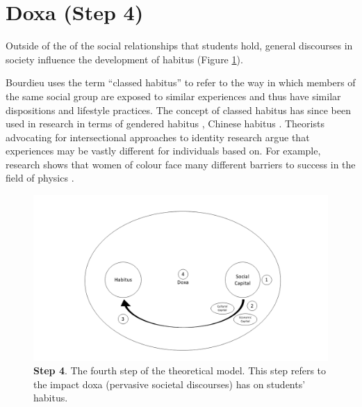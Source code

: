 \section{Doxa (Step 4)}
Outside of the of the social relationships that students hold, general discourses in society influence the development of habitus (Figure \ref{fig:TheoreticalModel4_C5}). 

Bourdieu uses the term ``classed habitus'' to refer to the way in which members of the same social group are exposed to similar experiences and thus have similar dispositions and lifestyle practices. The concept of classed habitus has since been used in research in terms of gendered habitus \citep{Reay_2004}, Chinese habitus \citep{Mu2014}. Theorists advocating for intersectional approaches to identity research argue that experiences may be vastly different for individuals based on. For example, research shows that women of colour face many different barriers to success in the field of physics \cite{ong2005body}.

\begin{figure}[ht]
\centering
\includegraphics[width=\textwidth]{C5 - Understanding Capital Accumulation/HabitusSocCap_TheoreticalModel4.png}
\caption{\label{fig:TheoreticalModel4_C5}\textbf{Step 4}. The fourth step of the theoretical model. This step refers to the impact doxa (pervasive societal discourses) has on students' habitus.}
\end{figure}

